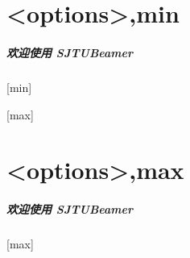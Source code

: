 \documentclass[
    aspectratio=169
]{ctexbeamer}
\begin{document}
\part{<options>,min}
\begin{frame}
  \frametitle{欢迎使用 SJTUBeamer}
\end{frame}
[min]
\makebottom

\subtitle{<options>,max}
\logo{\resizebox{!}{1cm}{\sjtubadge}}
\titlegraphic{\sjtubg[opacity=0.2]}
[max]
\maketitle
\part{<options>,max}
\begin{frame}
  \frametitle{欢迎使用 SJTUBeamer}
\end{frame}
[max]
\makebottom
\end{document}
